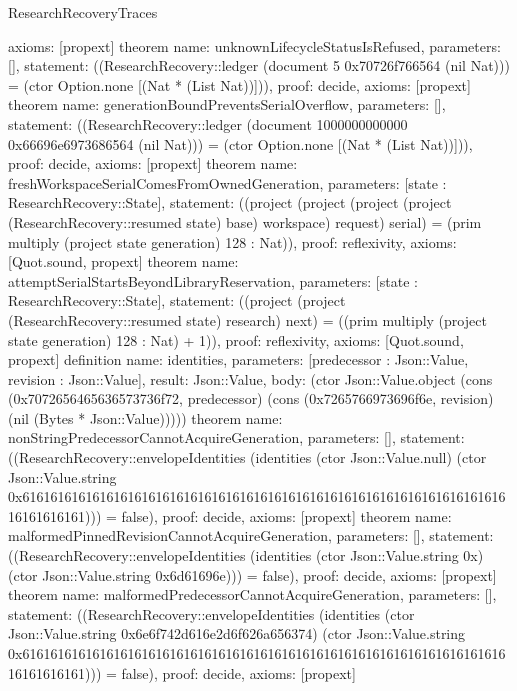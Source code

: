 \begin{lexlean}{ResearchRecoveryTraces}
\begin{semanticmodule}
{ axioms: [propext]
}
theorem{
 name: unknownLifecycleStatusIsRefused,
 parameters: [],
 statement: ((ResearchRecovery::ledger (document 5 0x70726f766564 (nil Nat))) = (ctor Option.none [(Nat * (List Nat))])),
 proof: decide{},
 axioms: [propext]
}
theorem{
 name: generationBoundPreventsSerialOverflow,
 parameters: [],
 statement: ((ResearchRecovery::ledger (document 1000000000000 0x66696e6973686564 (nil Nat))) = (ctor Option.none [(Nat * (List Nat))])),
 proof: decide{},
 axioms: [propext]
}
theorem{
 name: freshWorkspaceSerialComesFromOwnedGeneration,
 parameters: [state : ResearchRecovery::State],
 statement: ((project (project (project (project (ResearchRecovery::resumed state) base) workspace) request) serial) = (prim multiply (project state generation) 128 : Nat)),
 proof: reflexivity{},
 axioms: [Quot.sound, propext]
}
theorem{
 name: attemptSerialStartsBeyondLibraryReservation,
 parameters: [state : ResearchRecovery::State],
 statement: ((project (project (ResearchRecovery::resumed state) research) next) = ((prim multiply (project state generation) 128 : Nat) + 1)),
 proof: reflexivity{},
 axioms: [Quot.sound, propext]
}
definition{
 name: identities,
 parameters: [predecessor : Json::Value, revision : Json::Value],
 result: Json::Value,
 body: (ctor Json::Value.object (cons (0x7072656465636573736f72, predecessor) (cons (0x7265766973696f6e, revision) (nil (Bytes * Json::Value)))))
}
theorem{
 name: nonStringPredecessorCannotAcquireGeneration,
 parameters: [],
 statement: ((ResearchRecovery::envelopeIdentities (identities (ctor Json::Value.null) (ctor Json::Value.string 0x61616161616161616161616161616161616161616161616161616161616161616161616161616161))) = false),
 proof: decide{},
 axioms: [propext]
}
theorem{
 name: malformedPinnedRevisionCannotAcquireGeneration,
 parameters: [],
 statement: ((ResearchRecovery::envelopeIdentities (identities (ctor Json::Value.string 0x) (ctor Json::Value.string 0x6d61696e))) = false),
 proof: decide{},
 axioms: [propext]
}
theorem{
 name: malformedPredecessorCannotAcquireGeneration,
 parameters: [],
 statement: ((ResearchRecovery::envelopeIdentities (identities (ctor Json::Value.string 0x6e6f742d616e2d6f626a656374) (ctor Json::Value.string 0x61616161616161616161616161616161616161616161616161616161616161616161616161616161))) = false),
 proof: decide{},
 axioms: [propext]
}
\end{semanticmodule}
\end{lexlean}
